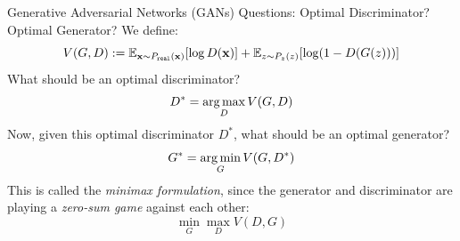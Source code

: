 \documentclass[xcolor=pdftex,dvipsnames,table,mathserif]{beamer}
\begin{document}
\begin{frame}{Generative Adversarial Networks (GANs)}
Questions: Optimal Discriminator? Optimal Generator?
We define:
\begin{equation*}
V(G,D):= \mathbb{E}_{\mathbf{x} \sim P_{\texttt{real}}(\mathbf{x})}[\log D(\mathbf{x})] + \mathbb{E}_{z \sim P_{z}(z)}[ \log (1-D(G(z)))]
\end{equation*}
What should be an optimal discriminator? \pause
\begin{equation*}
D^* = \operatorname*{arg\,max}_{D} V(G,D)
\end{equation*}
Now, given this optimal discriminator $D^*$, what should be an optimal generator? \pause
\begin{equation*}
G^* = \operatorname*{arg\,min}_{G} V(G,D^*)
\end{equation*}
This is called the \emph{minimax formulation}, since the generator and discriminator are playing a \emph{zero-sum game} against each other:
\begin{equation}
\min_{G} \max _{D} V(D,G)
\end{equation}
\end{frame}

\end{document}
